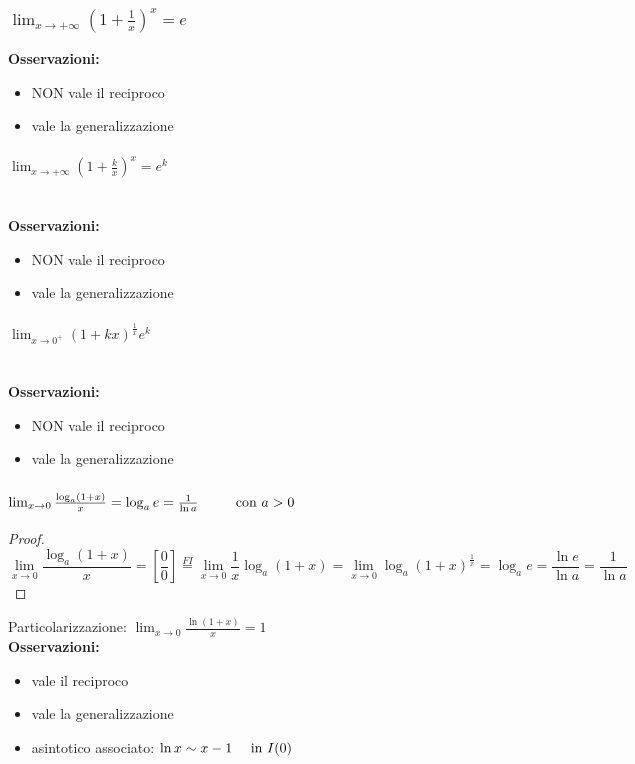 \documentclass{book}     %
\begin{document}
\subsubsection{$\lim_{x\to +\infty}\left(1+\frac{1}{x}\right)^{x} = e$}
\textbf{Osservazioni:}
\begin{itemize}
    \item NON vale il reciproco
    \item vale la generalizzazione
\end{itemize}

\paragraph{$\lim_{x\to +\infty}\left(1+\frac{k}{x}\right)^{x} = e^k$}~\\
\textbf{Osservazioni:}
\begin{itemize}
    \item NON vale il reciproco
    \item vale la generalizzazione
\end{itemize}

\paragraph{$\lim_{x\to 0^+}\left(1+kx\right)^{\frac{1}{x}}  e^k$}~\\
\textbf{Osservazioni:}
\begin{itemize}
    \item NON vale il reciproco
    \item vale la generalizzazione
\end{itemize}

\subsubsection{$\lim_{x\to 0}\frac{\log_a(1+x)}{x}=\log_ae=\frac{1}{\ln a}~~~~~~~~\textnormal{con }a>0$}
\begin{proof}
\[\lim_{x\to 0}\frac{\log_a(1+x)}{x}=\left[\frac{0}{0}\right]\overset{FI}{=}\lim_{x\to 0}\frac{1}{x}\log_a(1+x)=\lim_{x\to 0}\log_a(1+x)^\frac{1}{x}=\log_ae=\frac{\ln e}{\ln a}=\frac{1}{\ln a}\]
\end{proof}
Particolarizzazione: $\lim_{x\to0}\frac{\ln(1+x)}{x}=1$\\
\textbf{Osservazioni:}
\begin{itemize}
    \item vale il reciproco
    \item vale la generalizzazione
    \item asintotico associato: $\ln x \sim x - 1 ~~~~\textnormal{in } I(0)$
\end{itemize}
\end{document}
